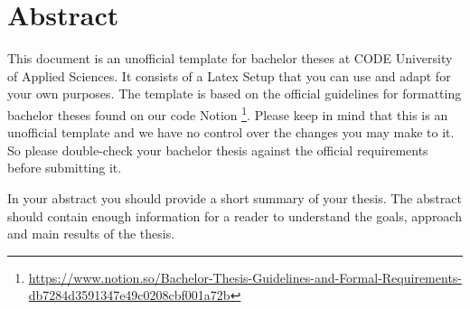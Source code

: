 \section*{Abstract}

This document is an unofficial template for bachelor theses at CODE University of Applied Sciences. It consists of a Latex Setup that you can use and adapt for your own purposes. The template is based on the official guidelines for formatting bachelor theses found on our code Notion \footnote{\url{https://www.notion.so/Bachelor-Thesis-Guidelines-and-Formal-Requirements-db7284d3591347e49c0208cbf001a72b}}. Please keep in mind that this is an unofficial template and we have no control over the changes you may make to it. So please double-check your bachelor thesis against the official requirements before submitting it.

In your abstract you should provide a short summary of your thesis. The abstract should contain enough information for a reader to understand the goals, approach and main results of the thesis.
